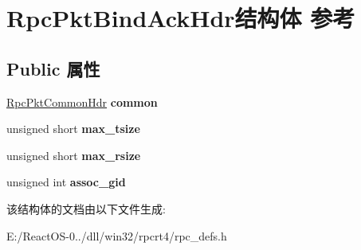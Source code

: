 \hypertarget{struct_rpc_pkt_bind_ack_hdr}{}\section{Rpc\+Pkt\+Bind\+Ack\+Hdr结构体 参考}
\label{struct_rpc_pkt_bind_ack_hdr}
\subsection*{Public 属性}
\begin{DoxyCompactItemize}
\item 
\mbox{\label{struct_rpc_pkt_bind_ack_hdr_afff700da3af458b59e300303de75971b}} 
\hyperlink{struct_rpc_pkt_common_hdr}{Rpc\+Pkt\+Common\+Hdr} {\bfseries common}
\item 
\mbox{\label{struct_rpc_pkt_bind_ack_hdr_a3410c0c7bf19beb3f97e952a9aa43440}} 
unsigned short {\bfseries max\+\_\+tsize}
\item 
\mbox{\label{struct_rpc_pkt_bind_ack_hdr_a6cac24bb8f1ef7c7b6da48d57b92b737}} 
unsigned short {\bfseries max\+\_\+rsize}
\item 
\mbox{\label{struct_rpc_pkt_bind_ack_hdr_a0f94ca31e2b1c779e3446b6959e30f7f}} 
unsigned int {\bfseries assoc\+\_\+gid}
\end{DoxyCompactItemize}


该结构体的文档由以下文件生成\+:\begin{DoxyCompactItemize}
\item 
E\+:/\+React\+O\+S-\/0../dll/win32/rpcrt4/rpc\+\_\+defs.\+h\end{DoxyCompactItemize}
